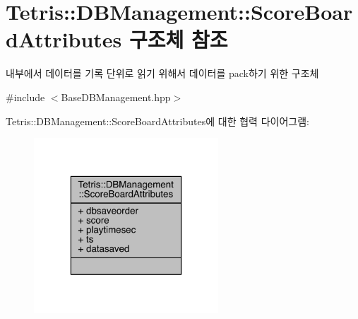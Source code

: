 \hypertarget{struct_tetris_1_1_d_b_management_1_1_score_board_attributes}{}\section{Tetris\+:\+:D\+B\+Management\+:\+:Score\+Board\+Attributes 구조체 참조}
\label{struct_tetris_1_1_d_b_management_1_1_score_board_attributes}


내부에서 데이터를 기록 단위로 읽기 위해서 데이터를 pack하기 위한 구조체  




{\ttfamily \#include $<$Base\+D\+B\+Management.\+hpp$>$}



Tetris\+:\+:D\+B\+Management\+:\+:Score\+Board\+Attributes에 대한 협력 다이어그램\+:
\nopagebreak
\begin{figure}[H]
\begin{center}
\leavevmode
\includegraphics[width=196pt]{dc/dd7/struct_tetris_1_1_d_b_management_1_1_score_board_attributes__coll__graph}
\end{center}
\end{figure}
